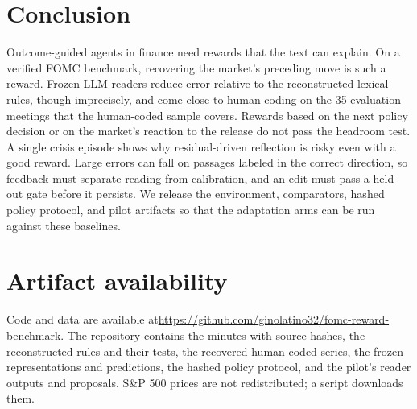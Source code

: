 \documentclass[sigconf]{acmart}
\begin{document}
\section{Conclusion}

Outcome-guided agents in finance need rewards that the text can explain. On a verified FOMC benchmark, recovering the market's preceding move is such a reward. Frozen LLM readers reduce error relative to the reconstructed lexical rules, though imprecisely, and come close to human coding on the 35 evaluation meetings that the human-coded sample covers. Rewards based on the next policy decision or on the market's reaction to the release do not pass the headroom test. A single crisis episode shows why residual-driven reflection is risky even with a good reward. Large errors can fall on passages labeled in the correct direction, so feedback must separate reading from calibration, and an edit must pass a held-out gate before it persists. We release the environment, comparators, hashed policy protocol, and pilot artifacts so that the adaptation arms can be run against these baselines.

\section*{Artifact availability}
Code and data are available at\newline \url{https://github.com/ginolatino32/fomc-reward-benchmark}. The repository contains the minutes with source hashes, the reconstructed rules and their tests, the recovered human-coded series, the frozen representations and predictions, the hashed policy protocol, and the pilot's reader outputs and proposals. S\&P 500 prices are not redistributed; a script downloads them.



\end{document}

